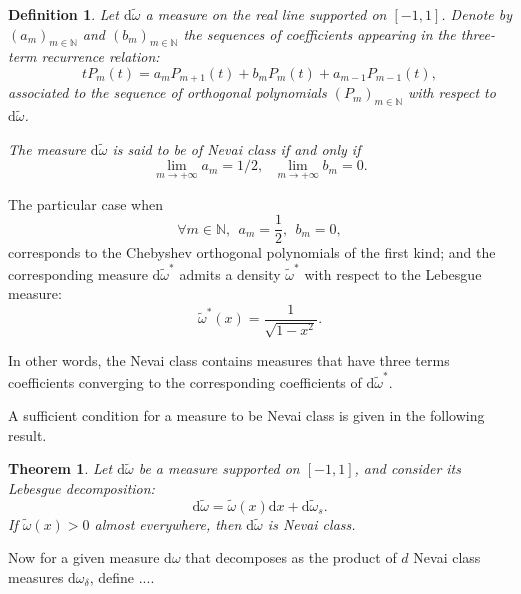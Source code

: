 \documentclass[twoside,11pt]{book}
\newtheorem{theorem}{Theorem}
\newtheorem{definition}{Definition}
\begin{document}
\begin{definition}


Let $\mathrm{d}\tilde{\omega}$ a measure on the real line supported on $[-1,1]$. Denote by $(a_{m})_{m \in \mathbb{N}}$ and $(b_{m})_{m \in \mathbb{N}}$ the sequences of coefficients appearing in the three-term recurrence relation:
\begin{equation}
t P_{m}(t) = a_{m}P_{m+1}(t) + b_{m}P_{m}(t) + a_{m-1}P_{m-1}(t),
\end{equation}
associated to the sequence of orthogonal polynomials $(P_{m})_{m \in \mathbb{N}}$ with respect to $\mathrm{d}\tilde{\omega}$.

The measure $\mathrm{d}\tilde{\omega}$ is said to be of Nevai class if and only if
\begin{equation}
\lim\limits_{m \rightarrow +\infty} a_{m} = 1/2, \:\:\: \lim\limits_{m \rightarrow +\infty} b_{m} = 0.
\end{equation}
\end{definition}
The particular case when 
\begin{equation}
\forall m \in \mathbb{N}, \:\: a_{m} = \frac{1}{2}, \:\: b_{m} =0,
\end{equation}
corresponds to the Chebyshev orthogonal polynomials of the first kind; and the corresponding measure $\mathrm{d}\tilde{\omega}^{*}$ admits a density $\tilde{\omega}^{*}$ with respect to the Lebesgue measure:
\begin{equation}
\tilde{\omega}^{*}(x) = \frac{1}{\sqrt{1-x^{2}}}.
\end{equation}

In other words, the Nevai class contains measures that have three terms coefficients converging to the corresponding coefficients of $\mathrm{d}\tilde{\omega}^{*}$.

A sufficient condition for a measure to be Nevai class is given in the following result.
\begin{theorem}
Let $\mathrm{d}\tilde{\omega}$ be a measure supported on $[-1,1]$, and consider its Lebesgue decomposition:
\begin{equation}
\mathrm{d}\tilde{\omega} = \tilde{\omega}(x) \mathrm{d}x + \mathrm{d}\tilde{\omega}_{s}.
\end{equation}
If $\tilde{\omega}(x) >0$ almost everywhere, then $\mathrm{d}\tilde{\omega}$ is Nevai class.
\end{theorem}

Now for a given measure $\mathrm{d}\omega$ that decomposes as the product of $d$ Nevai class measures $\mathrm{d}\omega_{\delta}$, define ....
\end{document}
